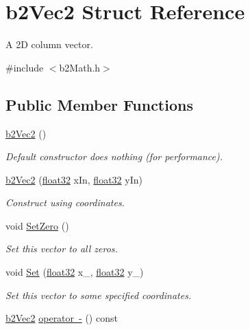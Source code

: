 \hypertarget{structb2_vec2}{}\section{b2\+Vec2 Struct Reference}
\label{structb2_vec2}


A 2D column vector.  




{\ttfamily \#include $<$b2\+Math.\+h$>$}

\subsection*{Public Member Functions}
\begin{DoxyCompactItemize}
\item 
\mbox{\hyperlink{structb2_vec2_a9171b31deb83af96872f99689939a12f}{b2\+Vec2}} ()
\begin{DoxyCompactList}\small\item\em Default constructor does nothing (for performance). \end{DoxyCompactList}\item 
\mbox{\hyperlink{structb2_vec2_a5d9a42aed33251a53c33a1ff7dd6be43}{b2\+Vec2}} (\mbox{\hyperlink{b2_settings_8h_aacdc525d6f7bddb3ae95d5c311bd06a1}{float32}} x\+In, \mbox{\hyperlink{b2_settings_8h_aacdc525d6f7bddb3ae95d5c311bd06a1}{float32}} y\+In)
\begin{DoxyCompactList}\small\item\em Construct using coordinates. \end{DoxyCompactList}\item 
void \mbox{\hyperlink{structb2_vec2_a5c6cbe27cfb29c6dbb29b9a3285b88d0}{Set\+Zero}} ()
\begin{DoxyCompactList}\small\item\em Set this vector to all zeros. \end{DoxyCompactList}\item 
void \mbox{\hyperlink{structb2_vec2_a4d61640a645e470a50b451307d8e94c3}{Set}} (\mbox{\hyperlink{b2_settings_8h_aacdc525d6f7bddb3ae95d5c311bd06a1}{float32}} x\+\_\+, \mbox{\hyperlink{b2_settings_8h_aacdc525d6f7bddb3ae95d5c311bd06a1}{float32}} y\+\_\+)
\begin{DoxyCompactList}\small\item\em Set this vector to some specified coordinates. \end{DoxyCompactList}\item 
\mbox{\hyperlink{structb2_vec2}{b2\+Vec2}} \mbox{\hyperlink{structb2_vec2_a80d431f7a92b72ec7c409ec5d403a720}{operator -\/}} () const

\end{DoxyCompactItemize}
